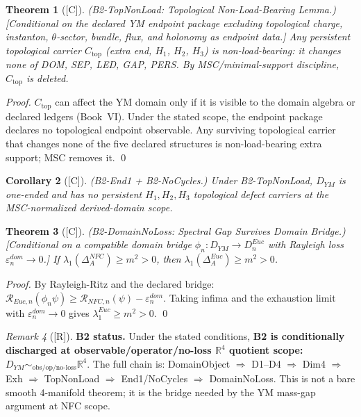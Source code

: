 \documentclass[12pt,oneside]{amsbook}
\theoremstyle{plain}
\newtheorem{theorem}{Theorem}[section]
\newtheorem{corollary}[theorem]{Corollary}
\theoremstyle{definition}
\theoremstyle{remark}
\newtheorem{remark}[theorem]{Remark}
\newcommand{\status}[1]{\textup{[#1]}}
\begin{document}
\begin{theorem}[\status{C}]\label{thm:B2-TopNonLoad}
\textup{(B2-TopNonLoad: Topological Non-Load-Bearing Lemma.)}
\textup{[Conditional on the declared YM endpoint package excluding
topological charge, instanton, $\theta$-sector, bundle, flux, and
holonomy as endpoint data.]}
Any persistent topological carrier $C_{\mathrm{top}}$ (extra end,
$H_1$, $H_2$, $H_3$) is non-load-bearing: it changes none of
DOM, SEP, LED, GAP, PERS. By MSC/minimal-support discipline,
$C_{\mathrm{top}}$ is deleted.
\end{theorem}

\begin{proof}
$C_{\mathrm{top}}$ can affect the YM domain only if it is visible to the
domain algebra or declared ledgers (Book~VI). Under the stated scope, the
endpoint package declares no topological endpoint observable. Any surviving
topological carrier that changes none of the five declared structures
is non-load-bearing extra support; MSC removes it.
\qed
\end{proof}

\begin{corollary}[\status{C}]\label{cor:B2-one-ended}
\textup{(B2-End1 + B2-NoCycles.)}
Under B2-TopNonLoad, $D_{YM}$ is one-ended and has no persistent
$H_1,H_2,H_3$ topological defect carriers at the MSC-normalized
derived-domain scope.
\end{corollary}

\begin{theorem}[\status{C}]\label{thm:B2-DomainNoLoss}
\textup{(B2-DomainNoLoss: Spectral Gap Survives Domain Bridge.)}
\textup{[Conditional on a compatible domain bridge $\phi_n : D_{YM}\to D_n^{Euc}$
with Rayleigh loss $\varepsilon_n^{dom}\to 0$.]}
If $\lambda_1(\Delta_A^{NFC})\ge m^2 > 0$, then
$\lambda_1(\Delta_A^{Euc}) \ge m^2 > 0$.
\end{theorem}

\begin{proof}
By Rayleigh-Ritz and the declared bridge:
$\mathcal{R}_{Euc,n}(\phi_n\psi) \ge \mathcal{R}_{NFC,n}(\psi) -
\varepsilon_n^{dom}$. Taking infima and the exhaustion limit with
$\varepsilon_n^{dom}\to 0$ gives $\lambda_1^{Euc}\ge m^2 > 0$.
\qed
\end{proof}

\begin{remark}[\status{R}]\label{rem:B2-status}
\textbf{B2 status.}
Under the stated conditions, \textbf{B2 is conditionally discharged at
observable/operator/no-loss $\mathbb{R}^4$ quotient scope:}
$D_{YM} \sim_{\mathrm{obs/op/no\text{-}loss}} \mathbb{R}^4$.
The full chain is:
DomainObject $\Rightarrow$ D1--D4 $\Rightarrow$ Dim4 $\Rightarrow$
Exh $\Rightarrow$ TopNonLoad $\Rightarrow$ End1/NoCycles
$\Rightarrow$ DomainNoLoss.
This is not a bare smooth 4-manifold theorem; it is the bridge
needed by the YM mass-gap argument at NFC scope.
\end{remark}
\end{document}
